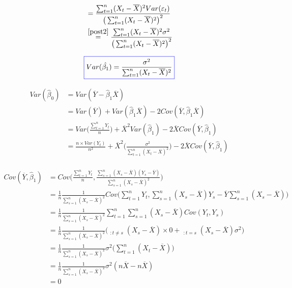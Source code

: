 \documentclass[11pt,french]{report}
\begin{document}
\begin{align*}
&= \frac{\sum_{t=1}^n(X_t- \overline{X})^2 Var(\varepsilon_t)}{\big( \sum_{t=1}^n(X_t - \overline{X})^2 \big)^2} \\
& \overset{\ref{post2}}{=} \frac{\sum_{t=1}^n(X_t- \overline{X})^2 \sigma^2}{\big( \sum_{t=1}^n(X_t - \overline{X})^2 \big)^2} \\
\end{align*}

\begin{equation}
\label{eq:varbeta1}
\color{blue}
\boxed{\color{black}
Var(\hat{\beta_1}) = \frac{\sigma^2}{\sum_{t=1}^n(X_t - \overline{X})^2}}
\end{equation}

\begin{align*}
Var(\hat{\beta}_0) &= Var(\overline{Y} - \hat{\beta}_1\overline{X})\\
&= Var(\overline{Y}) + Var(\hat{\beta}_1\overline{X}) -  2 Cov(\overline{Y}, \hat{\beta}_1\overline{X}) \\
&= Var\Big(\frac{\sum_{t=1}^n Y_t}{n} \Big) + \overline{X}^2 Var(\hat{\beta}_1) -  2 \overline{X} Cov(\overline{Y}, \hat{\beta}_1) \\
&= \frac{n \times Var(Y_t)}{n^2}  + \overline{X}^2 \Bigg(\frac{\sigma^2}{\sum_{t=1}^n (X_t - \overline{X})^2}\Bigg) -  2 \overline{X} Cov(\overline{Y}, \hat{\beta}_1) \\
\end{align*}

\begin{align*}
Cov(\overline{Y}, \hat{\beta}_1) &= Cov \Bigg( \frac{\sum_{t=1}^n Y_t}{n}, \frac{\sum_{s=1}^n(X_s- \overline{X})(Y_s - \overline{Y})}{\sum_{s=1}^n(X_s - \overline{X})^2} \Bigg) \\
&= \frac{1}{n}\frac{1}{\sum_{s=1}^n(X_s - \overline{X})^2} Cov\Bigg(\sum_{t=1}^n Y_t, \sum_{s=1}^n(X_s- \overline{X})Y_s - \overline{Y}\sum_{s=1}^n(X_s- \overline{X}) \Bigg) \\
&= \frac{1}{n}\frac{1}{\sum_{s=1}^n(X_s - \overline{X})^2} \sum_{t=1}^n \sum_{s=1}^n (X_s- \overline{X}) Cov(Y_t, Y_s) \\
&= \frac{1}{n}\frac{1}{\sum_{s=1}^n(X_s - \overline{X})^2} \Bigg( \mathop{\sum_{t=1}^n \sum_{s=1}^n}_{:t \neq s} (X_s- \overline{X}) \times 0 + \mathop{\sum_{t=1}^n \sum_{s=1}^n}_{:t = s} (X_s- \overline{X}) \sigma^2 \Bigg) \\
&= \frac{1}{n}\frac{1}{\sum_{s=1}^n(X_s - \overline{X})^2}\sigma^2 \bigg( \sum_{t=1}^n (X_t - \overline{X}) \bigg) \\
&= \frac{1}{n}\frac{1}{\sum_{s=1}^n(X_s - \overline{X})^2}\sigma^2 (n\overline{X}- n\overline{X}) \\
&= 0
\end{align*}
\end{document}
